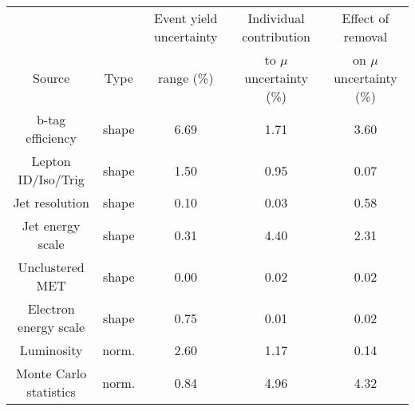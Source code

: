  \begin{adjustbox}{width=1\textwidth,center=\textwidth}
\begin{tabular}{ccccc} \hline \hline
&  & Event yield uncertainty &Individual contribution & Effect of removal  \\
Source & Type & range (\%) &  to $\mu$ uncertainty (\%) & on $\mu$ uncertainty (\%) \\ \hline 
b-tag efficiency & shape & 6.69 & 1.71 & 3.60\\
Lepton ID/Iso/Trig & shape & 1.50 & 0.95 & 0.07\\
Jet resolution & shape & 0.10 & 0.03 & 0.58\\
Jet energy scale & shape & 0.31 & 4.40 & 2.31\\
Unclustered MET & shape & 0.00 & 0.02 & 0.02\\
Electron energy scale & shape & 0.75 & 0.01 & 0.02\\
Luminosity & norm. & 2.60 & 1.17 & 0.14\\
Monte Carlo statistics & norm. & 0.84 & 4.96 & 4.32\\
\hline 
\hline 
\end{tabular}
 \end{adjustbox}
